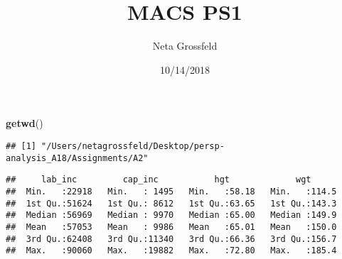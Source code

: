 \documentclass[]{article}
\title{MACS PS1}
\author{Neta Grossfeld}
\date{10/14/2018}
\newenvironment{Shaded}{\begin{snugshade}}{\end{snugshade}}
\newcommand{\KeywordTok}[1]{\textcolor[rgb]{0.13,0.29,0.53}{\textbf{{#1}}}}
\newcommand{\DataTypeTok}[1]{\textcolor[rgb]{0.13,0.29,0.53}{{#1}}}
\newcommand{\StringTok}[1]{\textcolor[rgb]{0.31,0.60,0.02}{{#1}}}
\newcommand{\CommentTok}[1]{\textcolor[rgb]{0.56,0.35,0.01}{\textit{{#1}}}}
\newcommand{\NormalTok}[1]{{#1}}
\begin{document}
\maketitle

\begin{Shaded}
\begin{Highlighting}[]
\KeywordTok{getwd}\NormalTok{()}
\end{Highlighting}
\end{Shaded}

\begin{verbatim}
## [1] "/Users/netagrossfeld/Desktop/persp-analysis_A18/Assignments/A2"
\end{verbatim}

\begin{Shaded}
\end{Shaded}

\begin{verbatim}
##     lab_inc         cap_inc           hgt             wgt       
##  Min.   :22918   Min.   : 1495   Min.   :58.18   Min.   :114.5  
##  1st Qu.:51624   1st Qu.: 8612   1st Qu.:63.65   1st Qu.:143.3  
##  Median :56969   Median : 9970   Median :65.00   Median :149.9  
##  Mean   :57053   Mean   : 9986   Mean   :65.01   Mean   :150.0  
##  3rd Qu.:62408   3rd Qu.:11340   3rd Qu.:66.36   3rd Qu.:156.7  
##  Max.   :90060   Max.   :19882   Max.   :72.80   Max.   :185.4
\end{verbatim}
\end{document}

